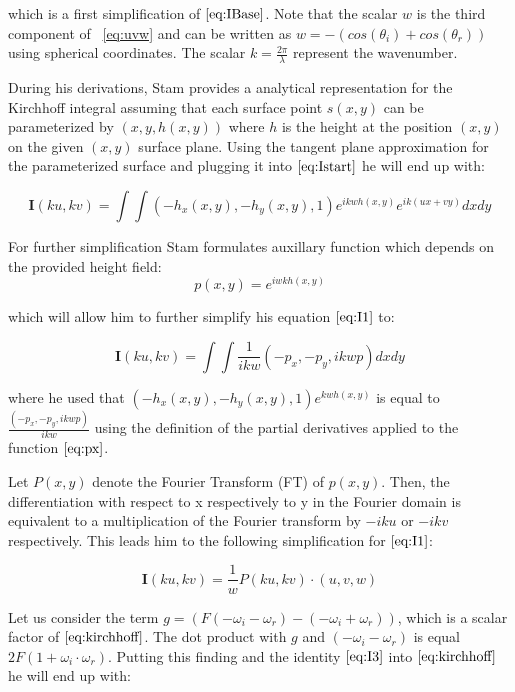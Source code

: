 which is a first simplification of $\ref{eq:IBase}$. Note that the scalar $w$ is the third component of ~\ref{eq:uvw} and can be written as $w = -(cos(\theta_i)+cos(\theta_r))$ using spherical coordinates. The scalar $k=\frac{2\pi}{\lambda}$ represent the wavenumber.


During his derivations, Stam provides a analytical representation for the Kirchhoff integral assuming that each surface point $s(x,y)$ can be parameterized by $(x,y,h(x,y))$ where $h$ is the height at the position $(x,y)$ on the given $(x,y)$ surface plane. Using the tangent plane approximation for the parameterized surface and plugging it into $\ref{eq:Istart}$ he will end up with: 

\begin{equation}
    \mathbf{I}(ku, kv) = \int \int (-h_{x}(x,y), -h_{y}(x,y), 1) e^{ikwh(x,y)} e^{ik(ux + vy)} dx dy
\label{eq:I1}
\end{equation}

For further simplification Stam formulates auxillary function which depends on the provided height field: 
\begin{equation}
  p(x,y) = e^{iwkh(x,y)} 
\label{eq:px}
\end{equation}

which will allow him to further simplify his equation $\ref{eq:I1}$ to:

\begin{equation}
    \mathbf{I}(ku, kv) = \int \int \frac{1}{ikw}(-p_x, -p_y, ikwp) dx dy
\label{eq:I2}
\end{equation}

where he used that $(-h_{x}(x,y), -h_{y}(x,y), 1)e^{kwh(x,y)}$ is equal to $\frac{(-p_x, -p_y, ikwp)}{ikw}$ using the definition of the partial derivatives applied to the function $\ref{eq:px}$.

Let $P(x,y)$ denote the Fourier Transform (FT) of $p(x,y)$. Then, the differentiation with respect to x respectively to y in the Fourier domain is equivalent to a multiplication of the Fourier transform by $-iku$ or $-ikv$ respectively. This leads him to the following simplification for $\ref{eq:I1}$:

\begin{equation}
    \mathbf{I}(ku, kv) = \frac{1}{w}P(ku, kv) \cdot (u,v,w)
\label{eq:I3}
\end{equation}

Let us consider the term $g = (F(-\omega_i - \omega_r)-(-\omega_i + \omega_r))$, which is a scalar factor of $\ref{eq:kirchhoff}$. The dot product with $g$ and $(-\omega_i - \omega_r)$ is equal $2F(1 + \omega_i \cdot \omega_r)$. Putting this finding and the identity $\ref{eq:I3}$ into $\ref{eq:kirchhoff}$ he will end up with:

